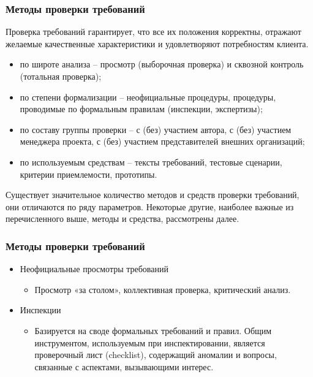 \documentclass{../industrial-development}
\begin{document}
{%
\begin{frame} \frametitle {Методы проверки требований}
  \begin{block}{}
\alert{Проверка требований} гарантирует, что все их положения корректны, отражают желаемые качественные характеристики и удовлетворяют потребностям клиента.
  \end{block}
\begin{itemize}
\item \alert{по широте анализа} – просмотр (выборочная проверка) и сквозной контроль (тотальная
проверка);
\item \alert{по степени формализации} – неофициальные процедуры, процедуры, проводимые по
формальным правилам (инспекции, экспертизы);
\item \alert{по составу группы проверки} – с (без) участием автора, с (без) участием менеджера
проекта, с (без) участием представителей внешних организаций;
\item \alert{по используемым средствам} – тексты требований, тестовые сценарии, критерии
приемлемости, прототипы.

\end{itemize}
\end{frame}

\lecturenotes

Существует значительное количество методов и средств проверки требований, они отличаются по ряду параметров. Некоторые другие, наиболее важные из перечисленного выше, методы и средства, рассмотрены далее.


\begin{frame} \frametitle {Методы проверки требований}

\begin{itemize}
\item \alert{Неофициальные просмотры требований}
\begin{itemize}
\item Просмотр «за столом», коллективная проверка, критический анализ.
\end{itemize}

\item  \alert{Инспекции}
\begin{itemize}
\item Базируется на своде формальных требований и правил.
Общим инструментом, используемым при инспектировании, является проверочный лист
(checklist), содержащий аномалии и вопросы,
связанные с аспектами, вызывающими интерес.
\end{itemize}


\end{itemize}
\end{frame}}
\end{document}
